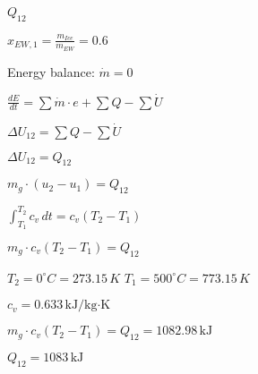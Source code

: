 \( Q_{12} \)  

\( x_{EW,1} = \frac{m_{Ice}}{m_{EW}} = 0.6 \)  

Energy balance:  
\( \dot{m} = 0 \)  

\( \frac{dE}{dt} = \sum \dot{m} \cdot e + \sum Q - \sum \dot{U} \)  

\( \Delta U_{12} = \sum Q - \sum \dot{U} \)  

\( \Delta U_{12} = Q_{12} \)  

\( m_g \cdot (u_2 - u_1) = Q_{12} \)  

\( \int_{T_1}^{T_2} c_v \, dt = c_v (T_2 - T_1) \)  

\( m_g \cdot c_v (T_2 - T_1) = Q_{12} \)  

\( T_2 = 0^\circ C = 273.15 \, K \)  
\( T_1 = 500^\circ C = 773.15 \, K \)  

\( c_v = 0.633 \, \text{kJ/kg·K} \)  

\( m_g \cdot c_v (T_2 - T_1) = Q_{12} = 1082.98 \, \text{kJ} \)  

\( Q_{12} = 1083 \, \text{kJ} \)